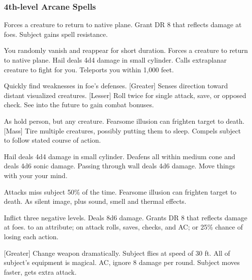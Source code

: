 \subsubsection{4th-level Arcane Spells} 
\begin{swspelllist}
     Forces a creature to return to native plane.
    \spellhead{}
     Grant DR 8 that reflects damage at foes.
     Subject gains spell resistance.

     You randomly vanish and reappear for short duration.
     Forces a creature to return to native plane.
     Hail deals 4d4 damage in small cylinder.
     Calls extraplanar creature to fight for you.
     Teleports you within 1,000 feet.

     Quickly find weaknesses in foe's defenses.
    [Greater] Senses direction toward distant visualized creatures.
    [Lesser] Roll twice for single attack, save, or opposed check.
     See into the future to gain combat bonuses.

     As hold person, but any creature.
     Fearsome illusion can frighten target to death.
    [Mass] Tire multiple creatures, possibly putting them to sleep.
     Compels subject to follow stated course of action.

     Hail deals 4d4 damage in small cylinder.
     Deafens all within medium cone and deals 4d6 sonic damage.
     Passing through wall deals 4d6 damage.
     Move things with your your mind.

     Attacks miss subject 50\% of the time.
     Fearsome illusion can frighten target to death.
    \spellhead{}
     As silent image, plus sound, smell and thermal effects.

     Inflict three negative levels.
     Deals 8d6 damage.
     Grants DR 8 that reflects damage at foes.
      to an attribute;  on attack rolls, saves, checks, and AC; or 25\% chance of losing each action.

    [Greater] Change weapon dramatically.
     Subject flies at speed of 30 ft.
     All of subject's equipment is magical.
      AC, ignore 8 damage per round.
     Subject moves faster, gets extra attack.
\end{swspelllist}

